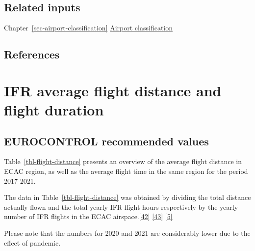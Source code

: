 \documentclass[
  11pt,
  a4paper,
]{book}
\begin{document}
\hypertarget{related-inputs-13}{%
\section{Related inputs}\label{related-inputs-13}}

Chapter~\ref{sec-airport-classification}
\protect\hyperlink{sec-airport-classification}{Airport classification}

\hypertarget{references-17}{%
\section{References}\label{references-17}}

\hypertarget{sec-if-average-flight-distance-and-flight-duration}{%
\chapter{IFR average flight distance and flight
duration}\label{sec-if-average-flight-distance-and-flight-duration}}

\hypertarget{eurocontrol-recommended-values-16}{%
\section{EUROCONTROL recommended
values}\label{eurocontrol-recommended-values-16}}

Table~\ref{tbl-flight-distance} presents an overview of the average
flight distance in ECAC region, as well as the average flight time in
the same region for the period 2017-2021.

The data in Table~\ref{tbl-flight-distance} was obtained by dividing the
total distance actually flown and the total yearly IFR flight hours
respectively by the yearly number of IFR flights in the ECAC
airspace.\protect\hyperlink{ref-ectrlprr2021}{{[}42{]}}
\protect\hyperlink{ref-ectrlprr2022}{{[}43{]}}
\protect\hyperlink{ref-ectrl:statfor:sid}{{[}5{]}}

Please note that the numbers for 2020 and 2021 are considerably lower
due to the effect of pandemic.
\end{document}

